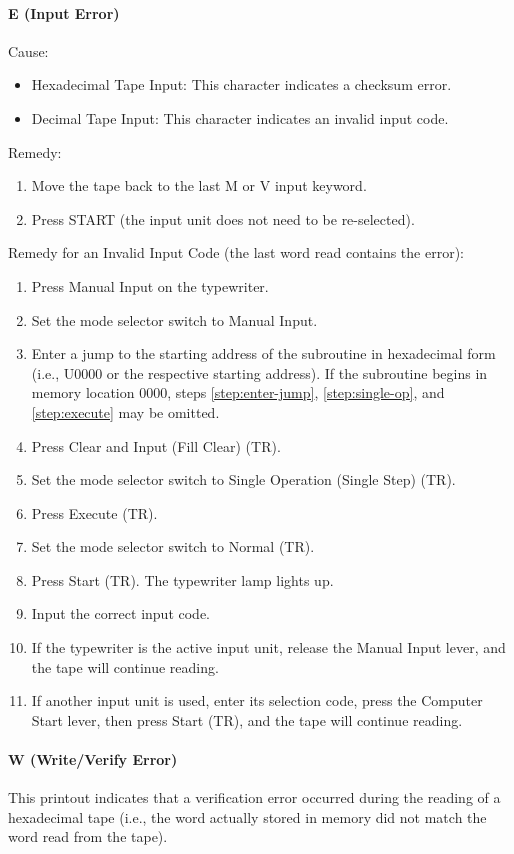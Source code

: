 \paragraph{E (Input Error)}
Cause:
\begin{itemize}
    \item Hexadecimal Tape Input: This character indicates a checksum error.
    \item Decimal Tape Input: This character indicates an invalid input code.
\end{itemize}
Remedy:
\begin{enumerate}[label=\alph*)]
\item Move the tape back to the last M or V input keyword.
\item Press START (the input unit does not need to be re-selected).
\end{enumerate}
Remedy for an Invalid Input Code (the last word read contains the error):
\begin{enumerate}[label=\alph*)]
\item Press Manual Input on the typewriter.
\item Set the mode selector switch to Manual Input.
\item \label{step:enter-jump} Enter a jump to the starting address of the subroutine in hexadecimal form (i.e., U0000 or the respective starting address). If the subroutine begins in memory location 0000, steps \ref{step:enter-jump}, \ref{step:single-op}, and \ref{step:execute} may be omitted. 
\item Press Clear and Input (Fill Clear) (TR).
\item \label{step:single-op} Set the mode selector switch to Single Operation (Single Step) (TR).
\item \label{step:execute} Press Execute (TR).
\item Set the mode selector switch to Normal (TR).
\item Press Start (TR). The typewriter lamp lights up.
\item Input the correct input code.
\item If the typewriter is the active input unit, release the Manual Input lever, and the tape will continue reading.
\item If another input unit is used, enter its selection code, press the Computer Start lever, then press Start (TR), and the tape will continue reading.
\end{enumerate}

\paragraph{W (Write/Verify Error)}
This printout indicates that a verification error occurred during the reading of a hexadecimal tape (i.e., the word actually stored in memory did not match the word read from the tape). 

